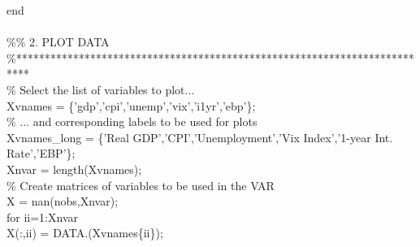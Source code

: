 \hspace{1mm}\textcolor{matlabblue}{end} \\ 
\hspace{1mm} \\ 
\hspace{1mm}\textcolor{matlabgreen}{\%}\textcolor{matlabgreen}{\% 2. PLOT DATA }\\ 
\hspace{1mm}\textcolor{matlabgreen}{\%**************************************************************************  }\\ 
\hspace{1mm}\textcolor{matlabgreen}{\% Select the list of variables to plot... }\\ 
\hspace{1mm}Xvnames = \{\textcolor{matlabpurple}{'gdp'},\textcolor{matlabpurple}{'cpi'},\textcolor{matlabpurple}{'unemp'},\textcolor{matlabpurple}{'vix'},\textcolor{matlabpurple}{'i1yr'},\textcolor{matlabpurple}{'ebp'}\}; \\ 
\hspace{1mm}\textcolor{matlabgreen}{\% ... and corresponding labels to be used \textcolor{matlabblue}{for} plots }\\ 
\hspace{1mm}\hspace{5mm} Xvnames\_long = \{\textcolor{matlabpurple}{'Real GDP'},\textcolor{matlabpurple}{'CPI'},\textcolor{matlabpurple}{'Unemployment'},\textcolor{matlabpurple}{'Vix Index'},\textcolor{matlabpurple}{'1-year Int. Rate'},\textcolor{matlabpurple}{'EBP'}\}; \\ 
\hspace{1mm}\hspace{5mm} Xnvar        = length(Xvnames); \\ 
\hspace{1mm}\hspace{5mm} \textcolor{matlabgreen}{\% Create matrices of variables to be used in the VAR }\\ 
\hspace{1mm}\hspace{5mm} X = nan(nobs,Xnvar); \\ 
\hspace{1mm}\hspace{5mm} \textcolor{matlabblue}{for} ii=1:Xnvar \\ 
\hspace{1mm}\hspace{5mm} \hspace{5mm} X(:,ii) = DATA.(Xvnames\{ii\}); \\ 

